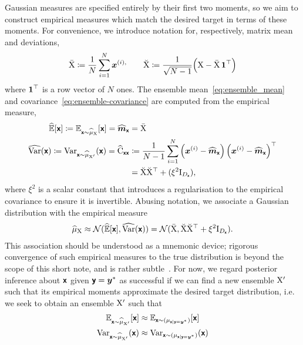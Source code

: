 \documentclass[wcp]{jmlr} %
\begin{document}
Gaussian measures are specified entirely by their first two moments, so we aim to construct empirical measures which match the desired target in terms of these moments.
For convenience, we introduce notation for, respectively, matrix mean and deviations,
\begin{align}
    \bar{\mathrm{X}} \coloneq \frac{1}{N}\sum_{i=1}^N \boldsymbol{x}^{(i),}
    \quad\quad
    \breve{\mathrm{X}} \coloneq \frac{1}{\sqrt{N-1}} \Bigl( \mathrm{X} - \bar{\mathrm{X}}\,\boldsymbol{1}^\top \Bigr)
     \label{eq:deviation_matrix}
\end{align}
where \(\boldsymbol{1}^\top\) is a row vector of \(N\) ones.
The ensemble mean~\eqref{eq:ensemble_mean} and covariance~\eqref{eq:ensemble-covariance} are computed from the empirical measure,
\begin{align}
    \widehat{\Ex}[\vrv{x}]\coloneq \Ex_{\vrv{x}\sim \ELaw[\mm{X}]}[ \vrv{x}] =\widehat{\vv{m}}_{\vrv{x}}
&=\mmmean{X}\label{eq:ensemble_mean} \\
\widehat{\var}(\vrv{x}) \coloneq\var_{\vrv{x}\sim \ELaw[\mm{X}']} (\vrv{x})=\widehat{\mm{C}}_{\vrv{xx}} &\coloneq \frac{1}{N-1} \sum_{i=1}^{N} \left(\vv{x}^{(i)} - \widehat{\vv{m}}_{\vrv{x}}\right)\left(\vv{x}^{(i)} - \widehat{\vv{m}}_{\vrv{x}}\right)^\top  \\
&=\mmdev{X} \mmdev{X}^\top + (\xi^2\mm{I}_{D_{\vrv{x}}}),\label{eq:ensemble-covariance}
\end{align}
where \(\xi^2\) is a scalar constant that introduces a regularisation to the empirical covariance to ensure it is invertible.
Abusing notation, we associate a Gaussian distribution with the empirical measure
\begin{align}
\ELaw[\mm{X}] \approx \Normal(\widehat{\Ex}[\vrv{x}], \widehat{\var}(\vrv{x})) = \Normal(\mmmean{X}, \mmdev{X} \mmdev{X}^\top + \xi^2\mm{I}_{D_{\vrv{x}}}).
\end{align}
This association should be understood as a mnemonic device;
rigorous convergence of such empirical measures to the true distribution is beyond the scope of this short note, and is rather subtle~\citep{LeGland2009Large,Mandel2011Convergence,Kelly2014Wellposedness,Kwiatkowski2015Convergence,DelMoral2017Stability}.
For now, we regard posterior inference about $\boldsymbol{\mathsf{x}}$ given $\boldsymbol{\mathsf{y}}=\boldsymbol{y}^*$ as successful if we can find a new ensemble $\mathrm{X}'$ such that its empirical moments approximate the desired target distribution, i.e. we seek to obtain an ensemble $\mathrm{X}'$ such that
\begin{align}
    \Ex_{\vrv{x}\sim \ELaw[\mm{X}']}[ \vrv{x}] &\approx \Ex_{\vrv{x}\sim (\Law[\vrv{x} \gvn \vrv{y}=\vv{y}^*])} [\vrv{x}]\\
    \var_{\vrv{x}\sim \ELaw[\mm{X}']} (\vrv{x}) &\approx \var_{\vrv{x}\sim (\Law[\vrv{x} \gvn \vrv{y}=\vv{y}^*])} (\vrv{x})
\end{align}
\end{document}
